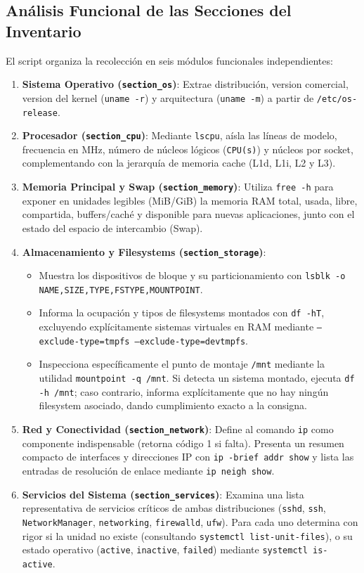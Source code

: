 \documentclass[11pt,a4paper]{article}
\begin{document}
\subsection{Análisis Funcional de las Secciones del Inventario}

El script organiza la recolección en seis módulos funcionales independientes:
\begin{enumerate}[leftmargin=*]
    \item \textbf{Sistema Operativo (\texttt{section\_os})}: Extrae distribución, version comercial, version del kernel (\texttt{uname -r}) y arquitectura (\texttt{uname -m}) a partir de \texttt{/etc/os-release}.
    \item \textbf{Procesador (\texttt{section\_cpu})}: Mediante \texttt{lscpu}, aísla las líneas de modelo, frecuencia en MHz, número de núcleos lógicos (\texttt{CPU(s)}) y núcleos por socket, complementando con la jerarquía de memoria cache (L1d, L1i, L2 y L3).
    \item \textbf{Memoria Principal y Swap (\texttt{section\_memory})}: Utiliza \texttt{free -h} para exponer en unidades legibles (MiB/GiB) la memoria RAM total, usada, libre, compartida, buffers/caché y disponible para nuevas aplicaciones, junto con el estado del espacio de intercambio (Swap).
    \item \textbf{Almacenamiento y Filesystems (\texttt{section\_storage})}: 
    \begin{itemize}
        \item Muestra los dispositivos de bloque y su particionamiento con \texttt{lsblk -o NAME,SIZE,TYPE,FSTYPE,MOUNTPOINT}.
        \item Informa la ocupación y tipos de filesystems montados con \texttt{df -hT}, excluyendo explícitamente sistemas virtuales en RAM mediante \texttt{--exclude-type=tmpfs --exclude-type=devtmpfs}.
        \item Inspecciona específicamente el punto de montaje \texttt{/mnt} mediante la utilidad \texttt{mountpoint -q /mnt}. Si detecta un sistema montado, ejecuta \texttt{df -h /mnt}; caso contrario, informa explícitamente que no hay ningún filesystem asociado, dando cumplimiento exacto a la consigna.
    \end{itemize}
    \item \textbf{Red y Conectividad (\texttt{section\_network})}: Define al comando \texttt{ip} como componente indispensable (retorna código 1 si falta). Presenta un resumen compacto de interfaces y direcciones IP con \texttt{ip -brief addr show} y lista las entradas de resolución de enlace mediante \texttt{ip neigh show}.
    \item \textbf{Servicios del Sistema (\texttt{section\_services})}: Examina una lista representativa de servicios críticos de ambas distribuciones (\texttt{sshd}, \texttt{ssh}, \texttt{NetworkManager}, \texttt{networking}, \texttt{firewalld}, \texttt{ufw}). Para cada uno determina con rigor si la unidad no existe (consultando \texttt{systemctl list-unit-files}), o su estado operativo (\texttt{active}, \texttt{inactive}, \texttt{failed}) mediante \texttt{systemctl is-active}.
\end{enumerate}
\end{document}

